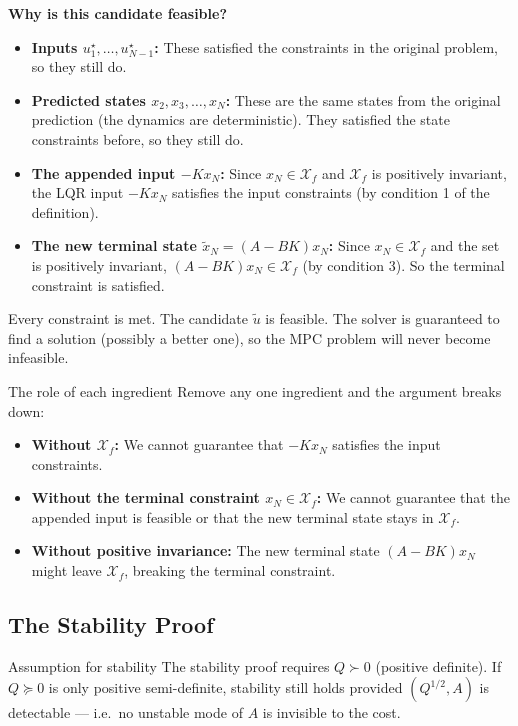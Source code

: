 \textbf{Why is this candidate feasible?}
\begin{itemize}
	\item \textbf{Inputs $u_1^\star, \ldots, u_{N-1}^\star$:} These satisfied the constraints in the original problem, so they still do.
	\item \textbf{Predicted states $x_2, x_3, \ldots, x_N$:} These are the same states from the original prediction (the dynamics are deterministic). They satisfied the state constraints before, so they still do.
	\item \textbf{The appended input $-Kx_N$:} Since $x_N \in \mathcal{X}_f$ and $\mathcal{X}_f$ is positively invariant, the LQR input $-Kx_N$ satisfies the input constraints (by condition 1 of the definition).
	\item \textbf{The new terminal state $\tilde{x}_N = (A - BK)x_N$:} Since $x_N \in \mathcal{X}_f$ and the set is positively invariant, $(A - BK)x_N \in \mathcal{X}_f$ (by condition 3). So the terminal constraint is satisfied.
\end{itemize}

Every constraint is met. The candidate $\tilde{u}$ is feasible. The solver is guaranteed to find a solution (possibly a better one), so the MPC problem will never become infeasible.

\begin{alertbox}{The role of each ingredient}
	Remove any one ingredient and the argument breaks down:
	\begin{itemize}[noitemsep]
		\item \textbf{Without $\mathcal{X}_f$:} We cannot guarantee that $-Kx_N$ satisfies the input constraints.
		\item \textbf{Without the terminal constraint $x_N \in \mathcal{X}_f$:} We cannot guarantee that the appended input is feasible or that the new terminal state stays in $\mathcal{X}_f$.
		\item \textbf{Without positive invariance:} The new terminal state $(A - BK)x_N$ might leave $\mathcal{X}_f$, breaking the terminal constraint.
	\end{itemize}
\end{alertbox}

\subsection{The Stability Proof}
\label{subsec:stability_proof}

\begin{alertbox}{Assumption for stability}
The stability proof requires $Q \succ 0$ (positive definite). If $Q \succeq 0$ is only positive semi-definite, stability still holds provided $(Q^{1/2}, A)$ is detectable --- i.e.\ no unstable mode of $A$ is invisible to the cost.
\end{alertbox}

